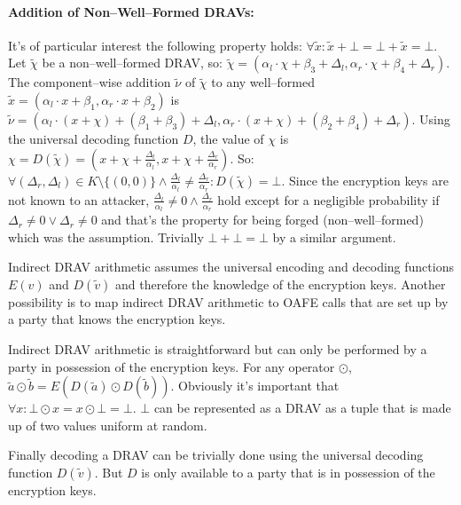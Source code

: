 \paragraph{Addition of Non--Well--Formed DRAVs:} It's of particular interest the
following property holds: $\forall \widetilde{x}: \widetilde{x} + \bot = \bot
+ \widetilde{x} = \bot$. Let $\widetilde{\chi}$ be a non--well--formed DRAV,
so: $\widetilde{\chi} = (\alpha_l \cdot \chi + \beta_3 + \Delta_l, \alpha_r
\cdot \chi + \beta_4 + \Delta_r)$. The component--wise addition
$\widetilde{\nu}$ of $\widetilde{\chi}$ to any well--formed $\widetilde{x} =
(\alpha_l \cdot x + \beta_1, \alpha_r \cdot x + \beta_2)$ is $\widetilde{\nu} =
(\alpha_l \cdot (x+\chi) + (\beta_1+\beta_3) + \Delta_l, \alpha_r \cdot (x+\chi)
+ (\beta_2+\beta_4) + \Delta_r)$. Using the universal decoding function $D$, the
value of $\chi$ is $\chi = D(\widetilde{\chi}) = (x + \chi +
\frac{\Delta_l}{\alpha_l}, x + \chi + \frac{\Delta_r}{\alpha_r})$. So: $\forall
(\Delta_r, \Delta_l) \in K \setminus \{(0, 0)\} \wedge \frac{\Delta_l}{\alpha_l}
\neq \frac{\Delta_r}{\alpha_r}: D(\widetilde{\chi}) = \bot$. Since the
encryption keys are not known to an attacker, $\frac{\Delta_l}{\alpha_l} \neq 0
\wedge \frac{\Delta_r}{\alpha_r}$ hold except for a negligible probability if
$\Delta_r \neq 0 \vee \Delta_r \neq 0$ and that's the property for being forged
(non--well--formed) which was the assumption. Trivially $\bot + \bot = \bot$ by
a similar argument.


\label{sec:indirect-DRAV-arithmetic}

Indirect DRAV arithmetic assumes the universal encoding and decoding functions
$E(v)$ and $D(\widetilde{v})$ and therefore the knowledge of the encryption
keys. Another possibility is to map indirect DRAV arithmetic to OAFE calls that
are set up by a party that knows the encryption keys.

Indirect DRAV arithmetic is straightforward but can only be performed by a party
in possession of the encryption keys. For any operator $\odot$, $\widetilde{a}
\odot \widetilde{b} = E(D(\widetilde{a}) \odot D(\widetilde{b}))$. Obviously
it's important that $\forall x: \bot \odot x = x \odot \bot = \bot$. $\bot$ can
be represented as a DRAV as a tuple that is made up of two values uniform at
random.


\label{sec:drav-final-decoding}

Finally decoding a DRAV can be trivially done using the universal decoding
function $D(\widetilde{v})$. But $D$ is only available to a party that is in
possession of the encryption keys.

